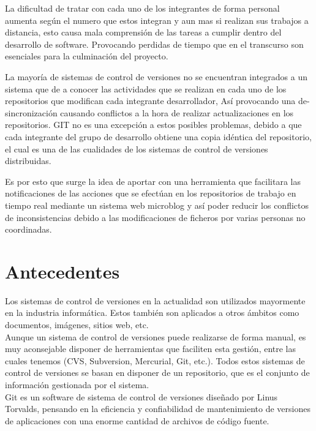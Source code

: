 \documentclass[letterpaper, 12pt,double,graphicx,caption,rotating]{report}
\begin{document}
\begin{titlepage}
La dificultad de tratar con cada uno de los integrantes de forma personal aumenta según el numero que estos integran y aun mas si realizan sus trabajos a distancia, esto causa mala comprensión de las tareas a cumplir dentro del desarrollo de software. Provocando perdidas de tiempo que en el transcurso son esenciales para la culminación del proyecto.

La mayoría de sistemas de control de versiones no se encuentran integrados a un sistema que de a conocer las actividades que se realizan en cada uno de los repositorios que modifican cada integrante desarrollador, Así provocando una de-sincronización causando conflictos a la hora de realizar actualizaciones en los repositorios.
GIT no es una excepción a estos posibles problemas, debido a que cada integrante del grupo de desarrollo obtiene una copia idéntica del repositorio, el cual es una de las cualidades de los sistemas de control de versiones distribuidas.

Es por esto que surge la idea de aportar con una herramienta que facilitara las notificaciones de las acciones que se efectúan en los repositorios de trabajo en tiempo real mediante un sistema web microblog y así poder reducir los conflictos de inconsistencias debido a las modificaciones de ficheros por varias personas no coordinadas.

\end{titlepage}
\newpage
\tableofcontents








\section{Antecedentes}
Los sistemas de control de versiones en la actualidad son utilizados mayormente en la industria informática. Estos también son aplicados a otros ámbitos como documentos, imágenes, sitios web, etc.\\

Aunque un sistema de control de versiones puede realizarse de forma manual, es muy aconsejable disponer de herramientas que faciliten esta gestión, entre las cuales tenemos (CVS, Subversion, Mercurial, Git, etc.). Todos estos sistemas de control de versiones se basan en disponer de un repositorio, que es el conjunto de información gestionada por el sistema.\\

Git es un software de sistema de control de versiones diseñado por Linus Torvalds, pensando en la eficiencia y confiabilidad de mantenimiento de versiones de aplicaciones con una enorme cantidad de archivos de código fuente.
\end{document}
